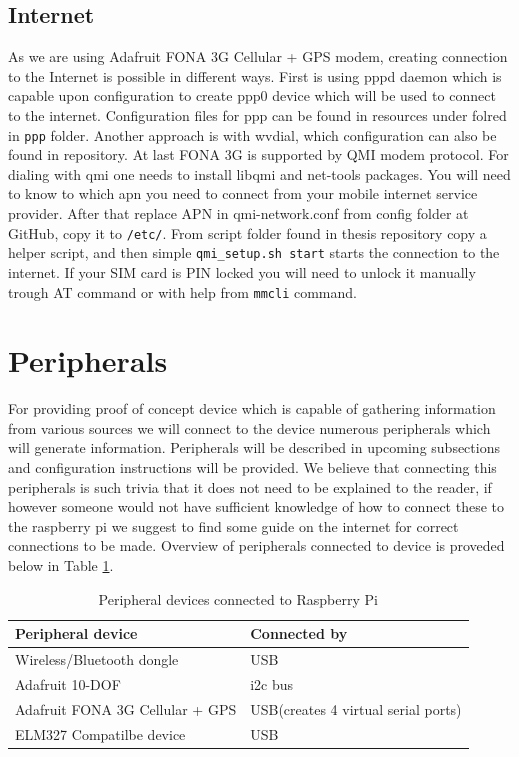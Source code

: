 \subsection{Internet} %
\label{sub:internet}
As we are using Adafruit FONA 3G Cellular + GPS modem, creating connection to the Internet is possible in different ways. First is using pppd daemon which is capable upon configuration to create ppp0 device which will be used to connect to the internet. Configuration files for ppp can be found in resources under folred in \verb|ppp| folder. Another approach is with wvdial, which configuration can also be found in repository. At last FONA 3G is supported by QMI modem protocol. For dialing with qmi one needs to install libqmi and net-tools packages. You will need to know to which apn you need to connect from your mobile internet service provider. After that replace APN in qmi-network.conf from config folder at GitHub, copy it to \verb|/etc/|. From script folder found in thesis repository copy a helper script, and then simple \verb|qmi_setup.sh start| starts the connection to the internet. If your SIM card is PIN locked you will need to unlock it manually trough AT command or with help from \verb|mmcli| command.
\newpage
\section{Peripherals} %
\label{sec:peripherals}
For providing proof of concept device which is capable of gathering information from various sources we will connect to the device numerous peripherals which will generate information.  Peripherals will be described in upcoming subsections and configuration instructions will be provided. We believe that connecting this peripherals is such trivia that it does not need to be explained to the reader, if however someone would not have sufficient knowledge of how to connect these to the raspberry pi we suggest to find some guide on the internet for correct connections to be made. Overview of peripherals connected to device is proveded below in Table \ref{tab:tab2}.
\begin{table}[H]
 \begin{center}
   \begin{tabular}{l l}
   Peripheral device & Connected by\\
   \hline
   	Wireless/Bluetooth dongle & USB\\
	Adafruit 10-DOF & \gls{i2c} bus\\
	Adafruit FONA 3G Cellular + GPS & USB(creates 4 virtual serial ports)\\
	ELM327 Compatilbe device & USB\\
   \hline
   \end{tabular}
 \end{center}
 \caption{Peripheral devices connected to Raspberry Pi}
 \label{tab:tab2}
\end{table}
